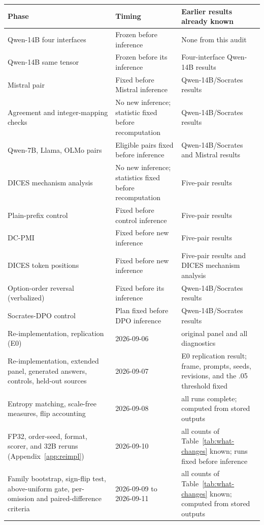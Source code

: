 \documentclass[11pt]{article}
\begin{document}
\begin{table}[t]
\centering
\scriptsize
\setlength{\tabcolsep}{5pt}
\begin{tabular}{@{}p{}p{}p{}@{}}
\toprule
Phase & Timing & Earlier results already known \\
\midrule
Qwen-14B four interfaces & Frozen before inference & None from this audit \\
Qwen-14B same tensor & Frozen before its inference & Four-interface Qwen-14B results \\
Mistral pair & Fixed before Mistral inference & Qwen-14B/Socrates results \\
Agreement and integer-mapping checks & No new inference; statistic fixed before recomputation & Qwen-14B/Socrates results \\
Qwen-7B, Llama, OLMo pairs & Eligible pairs fixed before inference & Qwen-14B/Socrates and Mistral results \\
DICES mechanism analysis & No new inference; statistics fixed before recomputation & Five-pair results \\
Plain-prefix control & Fixed before control inference & Five-pair results \\
DC-PMI & Fixed before new inference & Five-pair results \\
DICES token positions & Fixed before new inference & Five-pair results and DICES mechanism analysis \\
Option-order reversal (verbalized) & Fixed before its inference & Qwen-14B/Socrates results \\
Socrates-DPO control & Plan fixed before DPO inference & Qwen-14B/Socrates results \\
Re-implementation, replication (E0) & 2026-09-06 & original panel and all diagnostics \\
Re-implementation, extended panel, generated answers, controls, held-out sources & 2026-09-07 & E0 replication result; frame, prompts, seeds, revisions, and the .05 threshold fixed \\
Entropy matching, scale-free measures, flip accounting & 2026-09-08 & all runs complete; computed from stored outputs \\
FP32, order-seed, format, scorer, and 32B reruns (Appendix~\ref{app:reimpl}) & 2026-09-10 & all counts of Table~\ref{tab:what-changes} known; runs fixed before inference \\
Family bootstrap, sign-flip test, above-uniform gate, per-omission and paired-difference criteria & 2026-09-09 to 2026-09-11 & all counts of Table~\ref{tab:what-changes} known; computed from stored outputs \\

\end{tabular}
\end{table}
\end{document}
